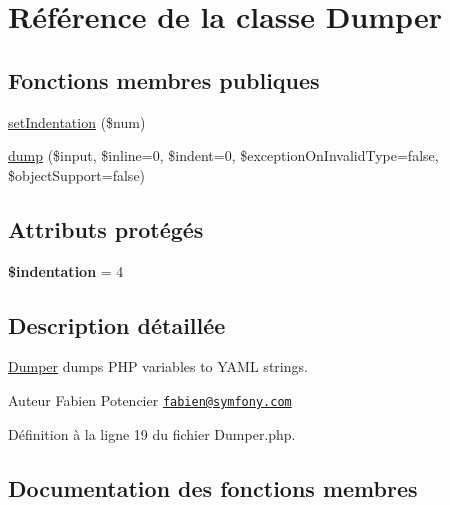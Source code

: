 \hypertarget{class_symfony_1_1_component_1_1_yaml_1_1_dumper}{}\section{Référence de la classe Dumper}
\label{class_symfony_1_1_component_1_1_yaml_1_1_dumper}
\subsection*{Fonctions membres publiques}
\begin{DoxyCompactItemize}
\item 
\hyperlink{class_symfony_1_1_component_1_1_yaml_1_1_dumper_ab2b7c7cb0706565e8a4fd1f341df7e23}{set\+Indentation} (\$num)
\item 
\hyperlink{class_symfony_1_1_component_1_1_yaml_1_1_dumper_ab773c8c8467123d239d535ff3afd1b72}{dump} (\$input, \$inline=0, \$indent=0, \$exception\+On\+Invalid\+Type=false, \$object\+Support=false)
\end{DoxyCompactItemize}
\subsection*{Attributs protégés}
\begin{DoxyCompactItemize}
\item 
{\bfseries \$indentation} = 4\hypertarget{class_symfony_1_1_component_1_1_yaml_1_1_dumper_aff1f1ea116fe6e27da24f330c01d8718}{}\label{class_symfony_1_1_component_1_1_yaml_1_1_dumper_aff1f1ea116fe6e27da24f330c01d8718}

\end{DoxyCompactItemize}


\subsection{Description détaillée}
\hyperlink{class_symfony_1_1_component_1_1_yaml_1_1_dumper}{Dumper} dumps P\+HP variables to Y\+A\+ML strings.

\begin{DoxyAuthor}{Auteur}
Fabien Potencier \href{mailto:fabien@symfony.com}{\tt fabien@symfony.\+com} 
\end{DoxyAuthor}


Définition à la ligne 19 du fichier Dumper.\+php.



\subsection{Documentation des fonctions membres}
